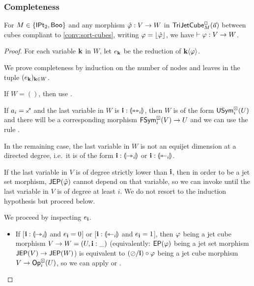 \documentclass[a4paper]{article}
\begin{document}
\subsubsection{Completeness}
\begin{theorem}[Completeness] \label{thm:calculus-complete}
	For $M \in \mathopen{}\left\{ {\mathsf{IPt}_2}, \mathsf{Boo} \right\}\mathclose{}$ and any morphism $\hat {\varphi} : V \to W$ in $\mathsf{TriJetCube}^{\Box}_{M}\mathopen{}\left( \vec a \right)\mathclose{}$ between cubes compliant to \cref{conv:sort-cubes}, writing $\varphi = \mathopen{}\left\lfloor \hat {\varphi} \right\rfloor\mathclose{}$, we have $\vdash \varphi : V \to W$.
\end{theorem}
\begin{proof}
	For each variable $\mathbf{k}$ in $W$, let $e_{\mathbf{k}}$ be the reduction of $\mathbf{k} \langle \varphi \rangle$.

	We prove completeness by induction on the number of nodes and leaves in the tuple $(e_{\mathbf{k}})_{\mathbf{k} \in W}$.
	
	If $W = ()$, then use .
	
	If $a_i = \ypolar$ and the last variable in $W$ is $\mathbf{i} : {\llparenthesis \leftrightarrowtriangle_i \rrparenthesis}$, then $W$ is of the form $\mathsf{USym}^\boxdot_i(U)$ and there will be a corresponding morphism $\mathsf{FSym}^\boxdot_i(V) \to U$ and we can use the rule .
	
	In the remaining case, the last variable in $W$ is not an equijet dimension at a directed degree, i.e.\ it is of the form $\mathbf{i} : {\llparenthesis \rightarrowtriangle_i \rrparenthesis}$ or $\mathbf{i} : {\llparenthesis \leftarrowtriangle_i \rrparenthesis}$.
	
	If the last variable in $V$ is of degree strictly lower than $\mathbf{i}$, then in order to be a jet set morphism, $\mathsf{JEP}(\hat {\varphi})$ cannot depend on that variable, so we can invoke  until the last variable in $V$ is of degree at least $i$. We do not resort to the induction hypothesis but proceed below.
	
	
	We proceed by inspecting $e_{\mathbf{i}}$.
	
	\begin{itemize}
		\item If [$\mathbf{i} : {\llparenthesis \rightarrowtriangle_i \rrparenthesis}$ and $e_{\mathbf{i}} = 0$] or [$\mathbf{i} : {\llparenthesis \leftarrowtriangle_i \rrparenthesis}$ and $e_{\mathbf{i}} = 1$], then $\varphi$ being a jet cube morphism $V \to W = (U, \mathbf{i} : \_)$ (equivalently: $\mathsf{EP}(\varphi)$ being a jet set morphism $\mathsf{JEP}(V) \to \mathsf{JEP}(W)$) is equivalent to $(\oslash / \mathbf{i}) \circ \varphi$ being a jet cube morphism $V \to {\mathsf{Op}}^\boxdot_i(U)$, so we can apply  or .
		

\end{itemize}
\end{proof}
\end{document}
